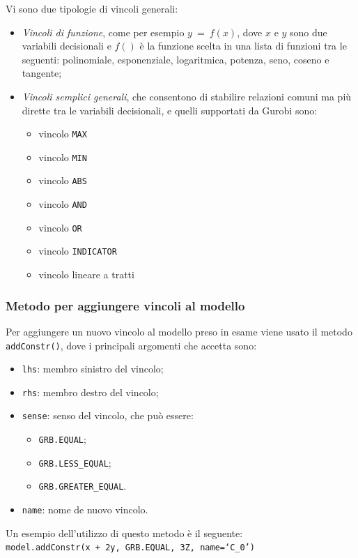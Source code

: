 Vi sono due tipologie di vincoli generali:
\begin{itemize}
\item \textit{Vincoli di funzione}, come per esempio $y ~ = ~ f(x)$, dove $x$ e $y$ sono due variabili decisionali e $f()$ è la funzione scelta in una lista di funzioni tra le seguenti: polinomiale, esponenziale, logaritmica, potenza, seno, coseno e tangente;
\item \textit{Vincoli semplici generali}, che consentono di stabilire relazioni comuni ma più dirette tra le variabili decisionali, e quelli supportati da Gurobi sono:
\begin{itemize}
\item vincolo \texttt{MAX}
\item vincolo \texttt{MIN}
\item vincolo \texttt{ABS}
\item vincolo \texttt{AND}
\item vincolo \texttt{OR}
\item vincolo \texttt{INDICATOR}
\item vincolo lineare a tratti
\end{itemize}
\end{itemize}

\subsubsection*{Metodo per aggiungere vincoli al modello}
Per aggiungere un nuovo vincolo al modello preso in esame viene usato il metodo \texttt{addConstr()}, dove i principali argomenti che accetta sono:
\begin{itemize}
\item \texttt{lhs}: membro sinistro del vincolo;
\item \texttt{rhs}: membro destro del vincolo;
\item \texttt{sense}: senso del vincolo, che può essere:
\begin{itemize}
\item \texttt{GRB.EQUAL};
\item \texttt{GRB.LESS\_EQUAL};
\item \texttt{GRB.GREATER\_EQUAL}.
\end{itemize}
\item \texttt{name}: nome de nuovo vincolo.
\end{itemize}

Un esempio dell'utilizzo di questo metodo è il seguente:\\
\texttt{model.addConstr(x + 2y, GRB.EQUAL, 3Z, name=`C\_0')}


